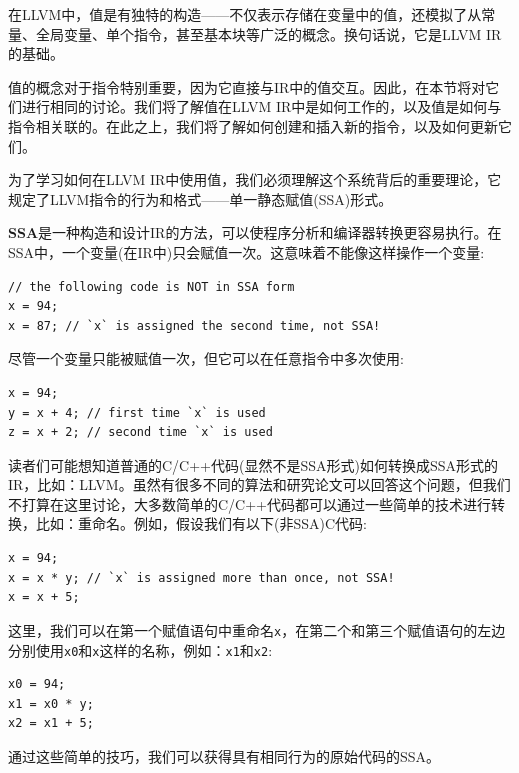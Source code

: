 
在LLVM中，值是有独特的构造——不仅表示存储在变量中的值，还模拟了从常量、全局变量、单个指令，甚至基本块等广泛的概念。换句话说，它是LLVM IR的基础。

值的概念对于指令特别重要，因为它直接与IR中的值交互。因此，在本节将对它们进行相同的讨论。我们将了解值在LLVM IR中是如何工作的，以及值是如何与指令相关联的。在此之上，我们将了解如何创建和插入新的指令，以及如何更新它们。

为了学习如何在LLVM IR中使用值，我们必须理解这个系统背后的重要理论，它规定了LLVM指令的行为和格式——单一静态赋值(SSA)形式。


\textbf{SSA}是一种构造和设计IR的方法，可以使程序分析和编译器转换更容易执行。在SSA中，一个变量(在IR中)只会赋值一次。这意味着不能像这样操作一个变量:

\begin{lstlisting}[style=styleCXX]
// the following code is NOT in SSA form
x = 94;
x = 87; // `x` is assigned the second time, not SSA!
\end{lstlisting}

尽管一个变量只能被赋值一次，但它可以在任意指令中多次使用:

\begin{lstlisting}[style=styleCXX]
x = 94;
y = x + 4; // first time `x` is used
z = x + 2; // second time `x` is used
\end{lstlisting}

读者们可能想知道普通的C/C++代码(显然不是SSA形式)如何转换成SSA形式的IR，比如：LLVM。虽然有很多不同的算法和研究论文可以回答这个问题，但我们不打算在这里讨论，大多数简单的C/C++代码都可以通过一些简单的技术进行转换，比如：重命名。例如，假设我们有以下(非SSA)C代码:

\begin{lstlisting}[style=styleCXX]
x = 94;
x = x * y; // `x` is assigned more than once, not SSA!
x = x + 5;
\end{lstlisting}

这里，我们可以在第一个赋值语句中重命名\texttt{x}，在第二个和第三个赋值语句的左边分别使用\texttt{x0}和\texttt{x}这样的名称，例如：\texttt{x1}和\texttt{x2}:

\begin{lstlisting}[style=styleCXX]
x0 = 94;
x1 = x0 * y;
x2 = x1 + 5;
\end{lstlisting}

通过这些简单的技巧，我们可以获得具有相同行为的原始代码的SSA。

